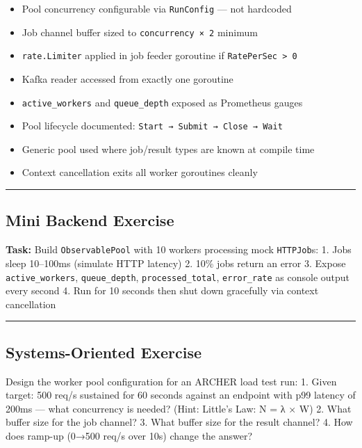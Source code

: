 \documentclass[11pt,a4paper,oneside]{book}
\providecommand{\tightlist}{\setlength{\itemsep}{0pt}\setlength{\parskip}{0pt}}
\begin{document}
\begin{itemize}
\tightlist
\item[$\square$]
  Pool concurrency configurable via \texttt{RunConfig} --- not hardcoded
\item[$\square$]
  Job channel buffer sized to \texttt{concurrency\ ×\ 2} minimum
\item[$\square$]
  \texttt{rate.Limiter} applied in job feeder goroutine if
  \texttt{RatePerSec\ \textgreater{}\ 0}
\item[$\square$]
  Kafka reader accessed from exactly one goroutine
\item[$\square$]
  \texttt{active\_workers} and \texttt{queue\_depth} exposed as
  Prometheus gauges
\item[$\square$]
  Pool lifecycle documented:
  \texttt{Start\ →\ Submit\ →\ Close\ →\ Wait}
\item[$\square$]
  Generic pool used where job/result types are known at compile time
\item[$\square$]
  Context cancellation exits all worker goroutines cleanly
\end{itemize}

\begin{center}\rule{0.5\linewidth}{0.5pt}\end{center}

\subsection{Mini Backend Exercise}

\textbf{Task:} Build \texttt{ObservablePool} with 10 workers processing
mock \texttt{HTTPJob}s: 1. Jobs sleep 10--100ms (simulate HTTP latency)
2. 10\% jobs return an error 3. Expose \texttt{active\_workers},
\texttt{queue\_depth}, \texttt{processed\_total}, \texttt{error\_rate}
as console output every second 4. Run for 10 seconds then shut down
gracefully via context cancellation

\begin{center}\rule{0.5\linewidth}{0.5pt}\end{center}

\subsection{Systems-Oriented
Exercise}

Design the worker pool configuration for an ARCHER load test run: 1.
Given target: 500 req/s sustained for 60 seconds against an endpoint
with p99 latency of 200ms --- what concurrency is needed? (Hint:
Little's Law: N = λ × W) 2. What buffer size for the job channel? 3.
What buffer size for the result channel? 4. How does ramp-up (0→500
req/s over 10s) change the answer?
\end{document}
